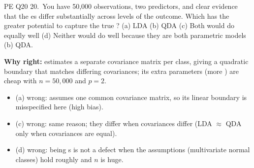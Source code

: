 \begin{qbox}{PE Q20}
20.~You have 50,000 observations, two predictors, and clear evidence that the es differ substantially across levels of the outcome. Which has the greater potential to capture the true ?
(a) LDA \quad (b) QDA \quad (c) Both would do equally well \quad (d) Neither would do well because they are both parametric models
\ans (b) QDA.\par
\textbf{Why right:}  estimates a separate covariance matrix per class, giving a quadratic boundary that matches differing covariances; its extra parameters (more ) are cheap with $n=50{,}000$ and $p=2$.
\begin{itemize}[leftmargin=1em,itemsep=0pt]
\item (a) wrong:  assumes one common covariance matrix, so its linear boundary is misspecified here (high bias).
\item (c) wrong: same reason; they differ when covariances differ (LDA $\approx$ QDA only when covariances are equal).
\item (d) wrong: being s is not a defect when the assumptions (multivariate normal classes) hold roughly and $n$ is huge.
\end{itemize}
\end{qbox}
